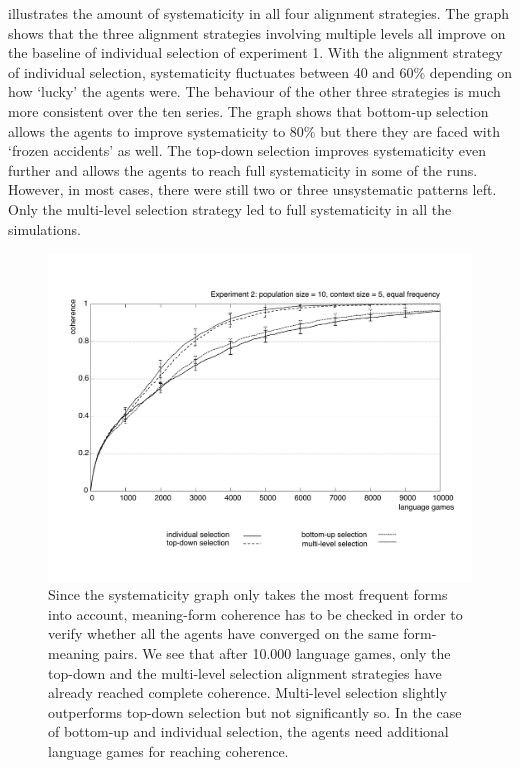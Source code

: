   illustrates the amount of systematicity in all four alignment strategies. The graph shows that the three alignment strategies involving multiple levels all improve on the baseline of individual selection of experiment 1. With the alignment strategy of individual selection, systematicity fluctuates between 40 and 60\% depending on how `lucky' the agents were. The behaviour of the other three strategies is much more consistent over the ten series. The graph shows that bottom-up selection allows the agents to improve systematicity to 80\% but there they are faced with `frozen accidents' as well. The top-down selection improves systematicity even further and allows the agents to reach full systematicity in some of the runs. However, in most cases, there were still two or three unsystematic patterns left. Only the multi-level selection strategy led to full systematicity in all the simulations.

\begin{figure}[t]
\centerline{\includegraphics[width=\textwidth]{Chapter4/figs/coherence-vs-2}}
  \caption[Experiment 2: meaning-form coherence]{Since the systematicity graph only takes the most frequent forms into account, meaning-form coherence has to be checked in order to verify whether all the agents have converged on the same form-meaning pairs. We see that after 10.000 language games, only the top-down and the multi-level selection alignment strategies have already reached complete coherence. Multi-level selection slightly outperforms top-down selection but not significantly so. In the case of bottom-up and individual selection, the agents need additional language games for reaching coherence.}
   \label{f:coherence2}
\end{figure}

